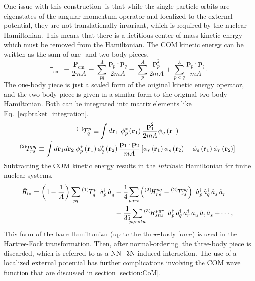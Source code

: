 \documentclass[thesis.tex]{subfiles}
\begin{document}
One issue with this construction, is that while the single-particle orbits are eigenstates of the angular momentum operator and localized to the external potential, they are not translationally invariant, which is required by the nuclear Hamiltonian.  This means that there is a fictitious center-of-mass kinetic energy which must be removed from the Hamiltonian.  The COM kinetic energy can be written as the sum of one- and two-body pieces,
\begin{equation}
  \Top_{\mathrm{cm}} = \frac{\mathbf{P}_{\mathrm{cm}}}{2mA} = \sum^{A}_{pq}\frac{\mathbf{p}_{p}\cdot\mathbf{p}_{q}}{2mA} = \sum^{A}_{p}\frac{\mathbf{p}^{2}_{p}}{2mA} + \sum^{A}_{p<q}\frac{\mathbf{p}_{p}\cdot\mathbf{p}_{q}}{mA}.
\end{equation}
The one-body piece is just a scaled form of the original kinetic energy operator, and the two-body piece is given in a similar form to the original two-body Hamiltonian.  Both can be integrated into matrix elements like Eq.\ \eqref{eq:braket_integration},
\begin{gather} \label{eq:ke_integration}
    {}^{\left(1\right)}\hspace{-1pt}T^{p}_{q} \equiv \int d\mathbf{r}_{1}\  \phi^{*}_{p}\left(\mathbf{r}_{1}\right) \frac{\mathbf{p}^{2}_{1}}{2mA} \phi_{q}\left(\mathbf{r}_{1}\right) \notag \\
    {}^{\left(2\right)}\hspace{-1pt}T^{pq}_{rs} \equiv \int d\mathbf{r}_{1} d\mathbf{r}_{2}\  \phi^{*}_{p}\left(\mathbf{r}_{1}\right)\phi^{*}_{q}\left(\mathbf{r}_{2}\right) \frac{\mathbf{p}_{1}\cdot\mathbf{p}_{2}}{mA} \left[\phi_{r}\left(\mathbf{r}_{1}\right)\phi_{s}\left(\mathbf{r}_{2}\right) - \phi_{s}\left(\mathbf{r}_{1}\right)\phi_{r}\left(\mathbf{r}_{2}\right)\right]
\end{gather}
Subtracting the COM kinetic energy results in the \textit{intrinsic} Hamiltonian for finite nuclear systems,
\begin{align} \label{eq:intrinsic_hamiltonian}
  \Ham_{\mathrm{in}} = \left(1 - \frac{1}{A}\right)\sum_{\mathclap{pq}}\KEint{1}{p}{q}\ \co{p}\ao{q} &+ \frac{1}{4}\sum_{\mathclap{pqrs}}\left(\Hint{2}{pq}{rs} - \KEint{2}{pq}{rs}\right)\ \co{p}\co{q}\ao{s}\ao{r} \notag \\
  &+ \frac{1}{36}\sum_{\mathclap{pqrstu}}\Hint{3}{pqr}{stu}\ \co{p}\co{q}\co{r}\ao{u}\ao{t}\ao{s} + \cdots,
\end{align}
This form of the bare Hamiltonian (up to the three-body force) is used in the Hartree-Fock transformation.  Then, after normal-ordering, the three-body piece is discarded, which is referred to as a NN+3N-induced interaction.  The use of a localized external potential has further complications involving the COM wave function that are discussed in section \ref{section:CoM}.
\end{document}
